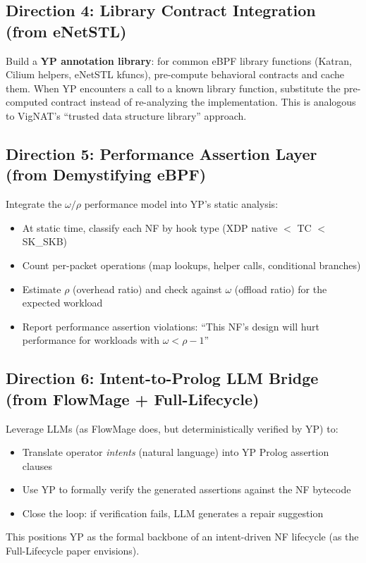 \documentclass[12pt, a4paper]{article}
\begin{document}
\subsection{Direction 4: Library Contract Integration (from eNetSTL)}

Build a \textbf{YP annotation library}: for common eBPF library functions (Katran, Cilium helpers, eNetSTL kfuncs), pre-compute behavioral contracts and cache them. When YP encounters a call to a known library function, substitute the pre-computed contract instead of re-analyzing the implementation. This is analogous to VigNAT's ``trusted data structure library'' approach.

\subsection{Direction 5: Performance Assertion Layer (from Demystifying eBPF)}

Integrate the $\omega/\rho$ performance model into YP's static analysis:
\begin{itemize}
  \item At static time, classify each NF by hook type (XDP native $<$ TC $<$ SK\_SKB)
  \item Count per-packet operations (map lookups, helper calls, conditional branches)
  \item Estimate $\rho$ (overhead ratio) and check against $\omega$ (offload ratio) for the expected workload
  \item Report performance assertion violations: ``This NF's design will hurt performance for workloads with $\omega < \rho - 1$''
\end{itemize}

\subsection{Direction 6: Intent-to-Prolog LLM Bridge (from FlowMage + Full-Lifecycle)}

Leverage LLMs (as FlowMage does, but deterministically verified by YP) to:
\begin{itemize}
  \item Translate operator \emph{intents} (natural language) into YP Prolog assertion clauses
  \item Use YP to formally verify the generated assertions against the NF bytecode
  \item Close the loop: if verification fails, LLM generates a repair suggestion
\end{itemize}
This positions YP as the formal backbone of an intent-driven NF lifecycle (as the Full-Lifecycle paper envisions).
\end{document}
